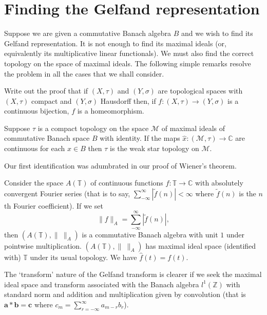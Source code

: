 \section{Finding the Gelfand representation}
Suppose we are given a commutative Banach algebra $B$ and
we wish to find its Gelfand representation. It is not
enough to find its maximal ideals (or, equivalently
its multiplicative linear functionals). We must also
find the correct topology on the space of maximal ideals.
The following simple remarks resolve the problem in
all the cases that we shall consider.
\begin{exercise} Write out the proof that if $(X,\tau)$
and $(Y,\sigma)$ are topological spaces
with $(X,\tau)$ compact and $(Y,\sigma)$ Hausdorff
then, if $f:(X,\tau)\rightarrow (Y,\sigma)$ is
a continuous bijection, $f$ is a homeomorphism.
\end{exercise}
\begin{lemma} Suppose $\tau$ is a compact
topology on the space
${\mathcal M}$ of maximal ideals of commutative Banach
space $B$ with identity. If the maps 
$\hat{x}:({\mathcal M},\tau)\rightarrow{\mathbb C}$
are continuous for each $x\in B$
then $\tau$ is the weak star topology on ${\mathcal M}$.
\end{lemma}

Our first identification was adumbrated in our proof of
Wiener's theorem.
\begin{example} Consider the space $A({\mathbb T})$
of continuous functions $f:{\mathbb T}\rightarrow{\mathbb C}$
with absolutely convergent
Fourier series (that is to say,
$\sum_{-\infty}^{\infty}|\tilde{f}(n)|<\infty$
where $\tilde{f}(n)$ is the $n$th Fourier coefficient). If we set
\[\|f\|_{A}=\sum_{-\infty}^{\infty}|\tilde{f}(n)|,\]
then $(A({\mathbb T}),\|\ \|_{A})$ is a commutative
Banach algebra with unit $1$ under pointwise multiplication.
$(A({\mathbb T}),\|\ \|_{A})$ has maximal ideal space
(identified with) ${\mathbb T}$ under its usual topology.
We have $\hat{f}(t)=f(t)$.
\end{example}
\begin{example} The `transform' nature of the Gelfand transform
is clearer if we seek the maximal ideal space and transform
associated with the Banach algebra $l^{1}({\mathbb Z})$
with standard norm and addition and multiplication
given by convolution (that is ${\mathbf a}*{\mathbf b}={\mathbf c}$
where $c_{m}=\sum_{r=-\infty}^{\infty}a_{m-r}b_{r}$).
\end{example}

